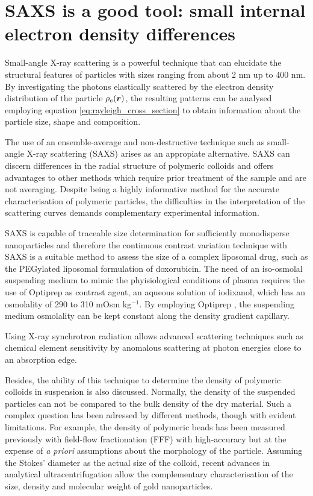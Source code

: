 \section{SAXS is a good tool: small internal electron density differences}

Small-angle X-ray scattering is a powerful technique that can elucidate the structural features of particles with sizes ranging from about 2 nm up to 400 nm. By investigating the photons elastically scattered by the electron density distribution of the particle $\rho_e ( \bm{r} )$, the resulting patterns can be analysed employing equation \ref{eq:rayleigh_cross_section} to obtain information about the particle size, shape and composition.

The use of an ensemble-average and non-destructive technique such as small-angle X-ray scattering (SAXS) arises as an appropiate alternative\citep{leonard_jr_size_1952,motzkus_untersuchung_1959}. SAXS can discern differences in the radial structure of polymeric colloids and offers advantages to other methods which require prior treatment of the sample and are not averaging\citep{silverstein_microstructure_1989,joensson_morphology_1991}. Despite being a highly informative method for the accurate characterisation of polymeric particles, the difficulties in the interpretation of the scattering curves demands complementary experimental information\citep{mykhaylyk_structural_2012}.

SAXS is capable of traceable size determination for sufficiently monodisperse nanoparticles \citep{meli_traceable_2012} and therefore the continuous contrast variation technique with SAXS is a suitable method to assess the size of a complex liposomal drug, such as the PEGylated liposomal formulation of doxorubicin. The need of an iso-osmolal suspending medium to mimic the phyisiological conditions of plasma requires the use of Optiprep \textregistered as contrast agent, an aqueous solution of iodixanol, which has an osmolality of 290 to 310 mOsm kg$^{-1}$. By employing Optiprep \textregistered, the suspending medium osmolality can be kept constant along the density gradient capillary.

Using X-ray synchrotron radiation allows advanced scattering techniques such as chemical element sensitivity by anomalous scattering at photon energies close to an absorption edge.




Besides, the ability of this technique to determine the density of polymeric colloids in suspension is also discussed. Normally, the density of the suspended particles can not be compared to the bulk density of the dry material. Such a complex question has been adressed by different methods, though with evident limitations. For example, the density of polymeric beads has been measured previously with field-flow fractionation (FFF) with high-accuracy but at the expense of \emph{a priori} assumptions about the morphology of the particle\citep{giddings_density_1981,yang_colloid_1983,caldwell_measurement_1986}. Assuming the Stokes' diameter as the actual size of the colloid, recent advances in analytical ultracentrifugation allow the complementary characterisation of the size, density and molecular weight of gold nanoparticles\citep{carney_determination_2011}.

